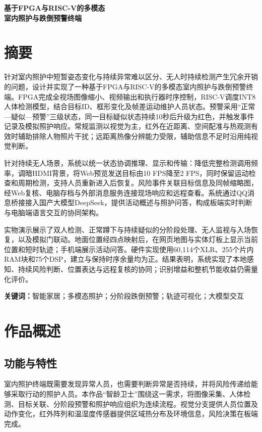 \documentclass[UTF8,a4paper,zihao=-4,fontset=none,scheme=plain]{ctexart}
\begin{document}
\begin{center}
 {\bfseries\fontsize{18bp}{27bp}\selectfont
 基于FPGA与RISC-V的多模态\\室内照护与跌倒预警终端\par}
\end{center}

\section*{摘要}
针对室内照护中短暂姿态变化与持续异常难以区分、无人时持续检测产生冗余开销的问题，设计并实现了一种基于FPGA与RISC-V的多模态室内照护与跌倒预警终端。FPGA完成全视场图像缩小、视频输出和执行器时序控制，RISC-V调度INT8人体检测模型，结合目标ID、框形变化及帧差运动维护人员状态。预警采用“正常—疑似—预警”三级状态，同一目标疑似状态持续10秒后升级为红色，并触发事件记录及模拟照护响应。常规监测以视觉为主，红外在近距离、空间配准与热观测有效时辅助排除人物照片干扰；远距离热像分辨能力受限，辅助信息不足时沿用纯视觉判断。

针对持续无人场景，系统以统一状态协调推理、显示和传输：降低完整检测调用频率，调暗HDMI背景，将Web预览发送目标由10 FPS降至2 FPS，同时保留运动检查和周期检测，支持人员重新进入后恢复。风险事件关联目标信息及同帧缩略图，经Web复核、电脑存档与外部消息服务连接现场响应和远程查看。系统通过QQ消息桥接接入国产大模型DeepSeek，提供活动概述与照护问答，构成板端实时判断与电脑端语言交互的协同架构。

实物演示展示了双人检测、正常蹲下与持续疑似的分阶段处理、无人监视与入场恢复，以及模拟门联动。地面位置经四点映射后，在网页地图与实体灯板上显示当前位置和短时轨迹；手机端展示活动问答。硬件实现使用60,114个XLR、255个片内RAM块和75个DSP，建立与保持时序余量均为正。结果表明，系统实现了本地感知、持续风险判断、位置表达与远程复核的协同；识别增益和整机节能收益仍需量化评价。

\par\vspace{12bp}
\noindent\textbf{关键词：}智能家居；多模态照护；分阶段跌倒预警；轨迹可视化；大模型交互

\clearpage
\section{作品概述}
\subsection{功能与特性}
室内照护终端既需要发现异常人员，也需要判断异常是否持续，并将风险传递给能够采取行动的照护人员。本作品“智龄卫士”围绕这一需求，将图像采集、人体检测、目标关联、分阶段预警和照护响应组织为连续流程。视觉分支提供人员位置及动作变化，红外阵列和温湿度传感器提供区域热分布及环境信息，风险决策在板端完成。
\end{document}
